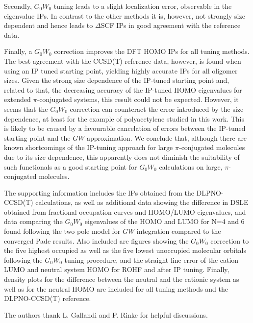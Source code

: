 \documentclass[journal=jctcce,manuscript=article,layout=twocolumn]{achemso}
\begin{document}
Secondly, $G_0W_0$ tuning leads to a slight localization error, observable in the eigenvalue IPs. In contrast to the other methods it is, however, not strongly size dependent and hence leads to $\Delta$SCF IPs in good agreement 
with the reference data.

Finally, a $G_0W_0$ correction improves the DFT HOMO IPs for all tuning methods. The best agreement with the CCSD(T) reference data, however, is found when using an IP tuned starting point, yielding highly accurate IPs for all oligomer sizes. Given the strong size dependence of the IP-tuned starting point and, related to that, the decreasing accuracy of the IP-tuned HOMO eigenvalues for extended $\pi$-conjugated systems, this result could not be expected. However, it seems that the
$G_0W_0$ correction can counteract the error introduced by the size dependence, at least for the example of polyacetylene studied in this work. This is likely to be caused by a favourable cancelation of errors between the IP-tuned starting point and the $GW$ approximation. 
We conclude that, although there are known shortcomings of the IP-tuning approach for large $\pi$-conjugated molecules due to its size dependence, this apparently does not diminish the suitability of such functionals as a good starting point for $G_0W_0$ calculations on large, $\pi$-conjugated molecules. 


\begin{suppinfo}
The supporting information includes the IPs obtained from the DLPNO-CCSD(T) calculations, as well as additional data showing the difference in DSLE obtained from fractional occupation curves and HOMO/LUMO eigenvalues, and data comparing the $G_0W_0$ eigenvalues of the HOMO and LUMO
for N=4 and 6 found following the two pole model for $GW$ integration compared to the converged Pade results.  
Also included are figures showing
the $G_0W_0$ correction to the five highest occupied as well as the five lowest unoccupied molecular orbitals following the 
$G_0W_0$ tuning procedure, and the straight
line error of the cation LUMO and neutral system HOMO for ROHF and after IP tuning. Finally, density plots for the difference between the neutral and the cationic system as well as for the neutral HOMO are included for all tuning 
methods and the DLPNO-CCSD(T) reference. 
\end{suppinfo}

\begin{acknowledgement}
The authors thank L. Gallandi 
and P. Rinke
for helpful discussions.
\end{acknowledgement}


\end{document}
